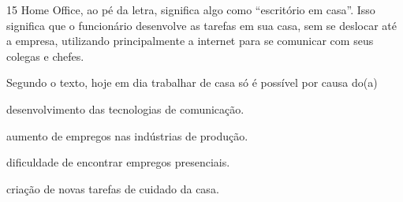 
\num{15} Home Office, ao pé da letra, significa algo como “escritório em casa”. Isso significa que o
funcionário desenvolve as tarefas em sua casa, sem se
deslocar até a empresa,
utilizando principalmente a internet para se comunicar com seus colegas e chefes.


\noindent{}Segundo o texto, hoje em dia trabalhar de casa só é possível por causa do(a)

\begin{escolha}
\item desenvolvimento das tecnologias de comunicação.

\item aumento de empregos nas indústrias de produção.

\item dificuldade de encontrar empregos presenciais.

\item criação de novas tarefas de cuidado da casa.
\end{escolha}

